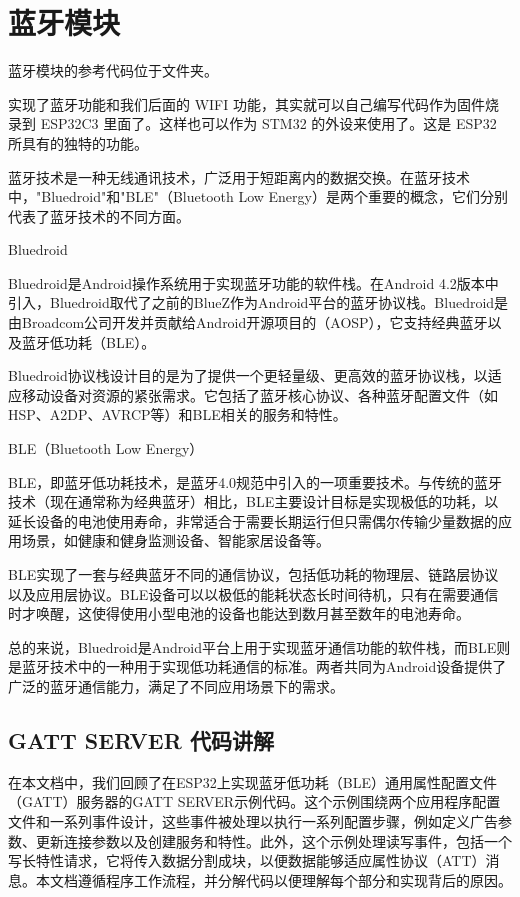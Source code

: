 \documentclass[lang=cn,newtx,10pt,scheme=chinese]{elegantbook}
\begin{document}
\chapter{蓝牙模块}

\begin{marker}
蓝牙模块的参考代码位于文件夹。
\end{marker}

实现了蓝牙功能和我们后面的 WIFI 功能，其实就可以自己编写代码作为固件烧录到 ESP32C3 里面了。这样也可以作为 STM32 的外设来使用了。这是 ESP32 所具有的独特的功能。

蓝牙技术是一种无线通讯技术，广泛用于短距离内的数据交换。在蓝牙技术中，"Bluedroid"和"BLE"（Bluetooth Low Energy）是两个重要的概念，它们分别代表了蓝牙技术的不同方面。

Bluedroid

Bluedroid是Android操作系统用于实现蓝牙功能的软件栈。在Android 4.2版本中引入，Bluedroid取代了之前的BlueZ作为Android平台的蓝牙协议栈。Bluedroid是由Broadcom公司开发并贡献给Android开源项目的（AOSP），它支持经典蓝牙以及蓝牙低功耗（BLE）。

Bluedroid协议栈设计目的是为了提供一个更轻量级、更高效的蓝牙协议栈，以适应移动设备对资源的紧张需求。它包括了蓝牙核心协议、各种蓝牙配置文件（如HSP、A2DP、AVRCP等）和BLE相关的服务和特性。

BLE（Bluetooth Low Energy）

BLE，即蓝牙低功耗技术，是蓝牙4.0规范中引入的一项重要技术。与传统的蓝牙技术（现在通常称为经典蓝牙）相比，BLE主要设计目标是实现极低的功耗，以延长设备的电池使用寿命，非常适合于需要长期运行但只需偶尔传输少量数据的应用场景，如健康和健身监测设备、智能家居设备等。

BLE实现了一套与经典蓝牙不同的通信协议，包括低功耗的物理层、链路层协议以及应用层协议。BLE设备可以以极低的能耗状态长时间待机，只有在需要通信时才唤醒，这使得使用小型电池的设备也能达到数月甚至数年的电池寿命。

总的来说，Bluedroid是Android平台上用于实现蓝牙通信功能的软件栈，而BLE则是蓝牙技术中的一种用于实现低功耗通信的标准。两者共同为Android设备提供了广泛的蓝牙通信能力，满足了不同应用场景下的需求。

\section{GATT SERVER 代码讲解}

在本文档中，我们回顾了在ESP32上实现蓝牙低功耗（BLE）通用属性配置文件（GATT）服务器的GATT SERVER示例代码。这个示例围绕两个应用程序配置文件和一系列事件设计，这些事件被处理以执行一系列配置步骤，例如定义广告参数、更新连接参数以及创建服务和特性。此外，这个示例处理读写事件，包括一个写长特性请求，它将传入数据分割成块，以便数据能够适应属性协议（ATT）消息。本文档遵循程序工作流程，并分解代码以便理解每个部分和实现背后的原因。
\end{document}
